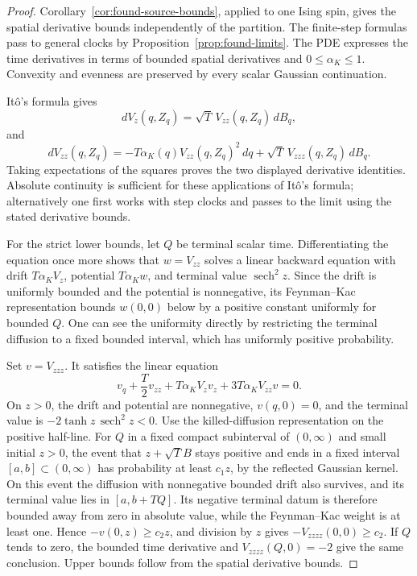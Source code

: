 \begin{proof}
Corollary~\ref{cor:found-source-bounds}, applied to one Ising spin,
gives the spatial derivative bounds independently of the partition.
The finite-step formulas pass to general clocks by
Proposition~\ref{prop:found-limits}.
The PDE expresses the time derivatives in terms of bounded spatial
derivatives and $0\le\alpha_K\le1$. Convexity and evenness are preserved
by every scalar Gaussian continuation.

It\^o's formula gives
\[
 dV_z(q,Z_q)=\sqrt T\,V_{zz}(q,Z_q)\,dB_q,
\]
and
\[
 dV_{zz}(q,Z_q)=-T\alpha_K(q)V_{zz}(q,Z_q)^2\,dq
                 +\sqrt T\,V_{zzz}(q,Z_q)\,dB_q.
\]
Taking expectations of the squares proves the two displayed derivative
identities. Absolute continuity is sufficient for these applications
of It\^o's formula; alternatively one first works with step clocks and
passes to the limit using the stated derivative bounds.

For the strict lower bounds, let $Q$ be terminal scalar time.
Differentiating the equation once more shows that $w=V_{zz}$ solves
a linear backward equation with drift $T\alpha_KV_z$, potential
$T\alpha_Kw$, and terminal value $\operatorname{sech}^2z$.
Since the drift is uniformly bounded and the potential is nonnegative,
its Feynman--Kac representation bounds $w(0,0)$ below by a positive
constant uniformly for bounded $Q$. One can see the uniformity directly
by restricting the terminal diffusion to a fixed bounded interval,
which has uniformly positive probability.

Set $v=V_{zzz}$. It satisfies the linear equation
\[
 v_q+\frac T2v_{zz}+T\alpha_KV_zv_z
          +3T\alpha_KV_{zz}v=0.
\]
On $z>0$, the drift and potential are nonnegative, $v(q,0)=0$, and
the terminal value is $-2\tanh z\,\operatorname{sech}^2z<0$.
Use the killed-diffusion representation on the positive half-line.
For $Q$ in a fixed compact subinterval of $(0,\infty)$ and small
initial $z>0$, the event that $z+\sqrt T B$ stays positive and ends
in a fixed interval $[a,b]\subset(0,\infty)$ has probability at least
$c_1z$, by the reflected Gaussian kernel. On this event the diffusion
with nonnegative bounded drift also survives, and its terminal value
lies in $[a,b+TQ]$. Its negative terminal datum is therefore bounded
away from zero in absolute value, while the Feynman--Kac weight is at
least one. Hence $-v(0,z)\ge c_2z$, and division by $z$ gives
$-V_{zzzz}(0,0)\ge c_2$. If $Q$ tends to zero, the bounded time
derivative and $V_{zzzz}(Q,0)=-2$ give the same conclusion. Upper
bounds follow from the spatial derivative bounds.
\end{proof}

